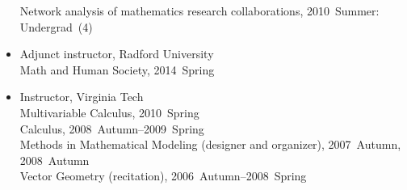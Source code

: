 \documentclass[10pt,a4paper]{article}
\begin{document}
\begin{itemize}[label=$\circ$,nolistsep]
Network analysis of mathematics research collaborations, 2010~Summer: Undergrad~(4)
\item
Adjunct instructor, Radford University \\
Math and Human Society, 2014~Spring
\item
Instructor, Virginia Tech \\
Multivariable Calculus, 2010~Spring \\
Calculus, 2008~Autumn--2009~Spring \\
Methods in Mathematical Modeling (designer and organizer), 2007~Autumn, 2008~Autumn \\
Vector Geometry (recitation), 2006~Autumn--2008~Spring

\end{itemize}
\end{document}
